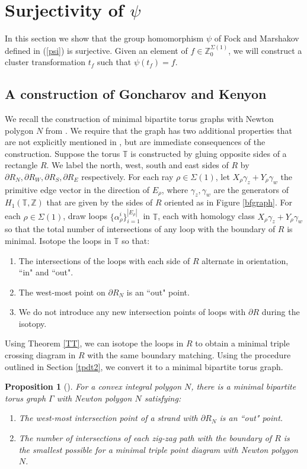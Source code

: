 \documentclass[11pt]{article} %
\newtheorem{proposition}[theorem]{Proposition}
\theoremstyle{definition}
\newcommand{\Z}{{\mathbb Z}}
\newcommand{\T}{{\mathbb T}}
\begin{document}
\section{Surjectivity of $\psi$}\label{sectionsurj}

In this section we show that the group homomorphism $\psi$ of Fock and Marshakov defined in (\ref{psi}) is surjective. Given an element of $f \in \Z^{\Sigma(1)}_0$, we will construct a cluster transformation $t_f$ such that $\psi(t_f)=f$.

\subsection{A construction of Goncharov and Kenyon}
We recall the construction of minimal bipartite torus graphs with Newton polygon $N$ from \cite{GK12}. We require that the graph has two  additional properties that are not explicitly mentioned in \cite{GK12}, but are immediate consequences of the construction. Suppose the torus $\mathbb T$ is constructed by gluing opposite sides of a rectangle $R$. We label the north, west, south and east sides of $R$ by $\partial R_N,\partial R_W,\partial R_S,\partial R_E$ respectively. For each ray $\rho \in \Sigma(1)$, let $X_\rho \gamma_z+Y_\rho \gamma_w$ the primitive edge vector in the direction of $E_\rho$, where $\gamma_z,\gamma_w$ are the generators of $H_1(\T,\Z)$ that are given by the sides of $R$ oriented as in Figure \ref{bfgraph}. For each $\rho \in \Sigma(1)$, draw loops $\{\alpha_\rho^i\}_{i=1}^{|E_\rho|}$ in $\T$, each with homology class $X_\rho \gamma_z+Y_\rho \gamma_w$ so that the total number of intersections of any loop with the boundary of $R$ is minimal. Isotope the loops in $\T$ so that:
\begin{enumerate}
    \item The intersections of the loops with each side of $R$ alternate in orientation, ``in" and ``out".
    \item The west-most point on $\partial R_N$ is an ``out" point.
    \item We do not introduce any new intersection points of loops with $\partial R$ during the isotopy.
\end{enumerate}
Using Theorem \ref{TT}, we can isotope the loops in $R$ to obtain a minimal triple crossing diagram in $R$ with the same boundary matching. Using the procedure outlined in Section \ref{tpdt2}, we convert it to a minimal bipartite torus graph. 
\begin{proposition}[\cite{GK12}]\label{gkpropn}
For a convex integral polygon $N$, there is a minimal bipartite torus graph $\Gamma$ with Newton polygon $N$ satisfying:
\begin{enumerate}
    \item The west-most intersection point of a strand with $\partial R_N$ is an ``out" point.
    \item The number of intersections of each zig-zag path with the boundary of $R$ is the smallest possible for a minimal triple point diagram with Newton polygon $N$.
\end{enumerate}
\end{proposition}
\end{document}
